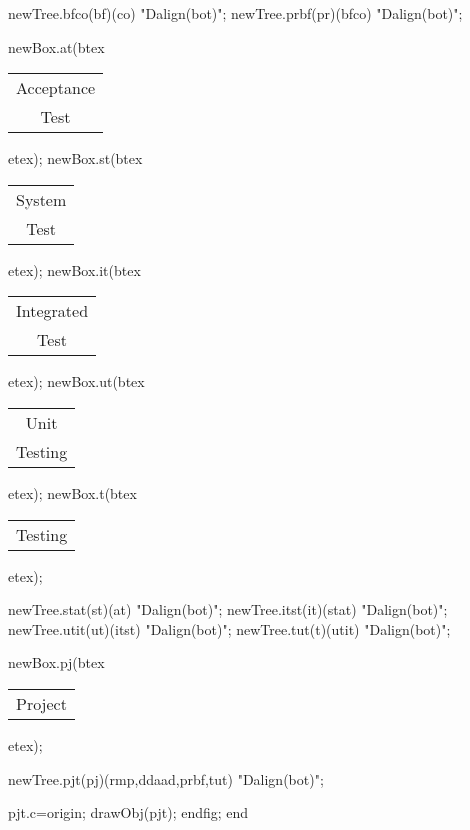 \documentclass[a4paper,11pt]{article}
\begin{document}
\begin{center}
\begin{mpdisplay}
newTree.bfco(bf)(co) "Dalign(bot)";
newTree.prbf(pr)(bfco) "Dalign(bot)";

newBox.at(btex \begin{tabular}{@{}c@{}} Acceptance\\ Test\strut \end{tabular} etex);
newBox.st(btex \begin{tabular}{@{}c@{}} System\\ Test\strut \end{tabular} etex);
newBox.it(btex \begin{tabular}{@{}c@{}} Integrated\\ Test\strut \end{tabular} etex);
newBox.ut(btex \begin{tabular}{@{}c@{}} Unit\\ Testing\strut \end{tabular} etex);
newBox.t(btex \begin{tabular}{@{}c@{}} Testing\strut \end{tabular} etex);

newTree.stat(st)(at) "Dalign(bot)";
newTree.itst(it)(stat) "Dalign(bot)";
newTree.utit(ut)(itst) "Dalign(bot)";
newTree.tut(t)(utit) "Dalign(bot)";

newBox.pj(btex \begin{tabular}{@{}c@{}} Project\strut \end{tabular} etex);

newTree.pjt(pj)(rmp,ddaad,prbf,tut) "Dalign(bot)";

pjt.c=origin;
drawObj(pjt);
endfig;
end
\end{mpdisplay}
\end{center}
\end{document}
